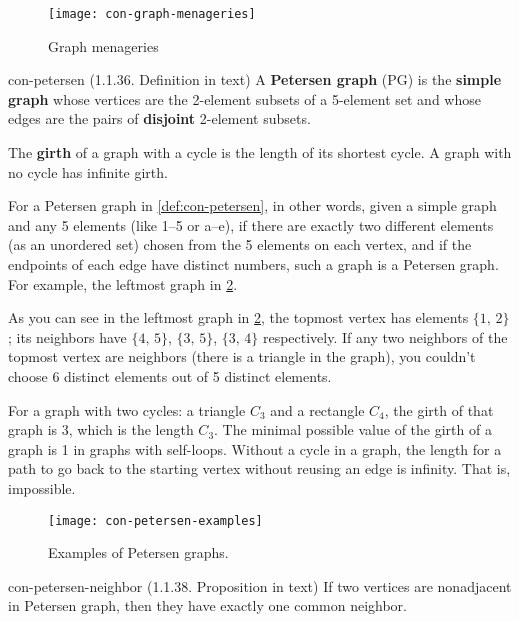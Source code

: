 \documentclass[../src/handouts/main.tex]{subfiles}
\begin{document}
\begin{figure}[htbp]
  \centering
  \texttt{[image: con-graph-menageries]}
  \caption{Graph menageries}
  \label{fig:con-graph-menageries}
\end{figure}

\begin{definition}{}{con-petersen}
  (1.1.36. Definition in text)
  A \textbf{Petersen graph} (PG) is the \textbf{simple graph} whose vertices are the 2-element subsets of a 5-element set and whose edges are the pairs of \textbf{disjoint} 2-element subsets.

  The \textbf{girth} of a graph with a cycle is the length of its shortest cycle. A graph with no cycle has infinite girth.
\end{definition}

For a Petersen graph in \cref{def:con-petersen}, in other words, given a simple graph and any 5 elements (like 1--5 or a--e), if there are exactly two different elements (as an unordered set) chosen from the 5 elements on each vertex, and if the endpoints of each edge have distinct numbers, such a graph is a Petersen graph. For example, the leftmost graph in \cref{fig:con-petersen-examples}.

As you can see in the leftmost graph in \cref{fig:con-petersen-examples}, the topmost vertex has elements $\{ 1,\, 2 \}$; its neighbors have $\{ 4,\, 5 \}$, $\{ 3,\, 5 \}$, $\{ 3,\, 4 \}$ respectively. If any two neighbors of the topmost vertex are neighbors (there is a triangle in the graph), you couldn't choose 6 distinct elements out of 5 distinct elements.

For a graph with two cycles: a triangle $C_3$ and a rectangle $C_4$, the girth of that graph is 3, which is the length $C_3$. The minimal possible value of the girth of a graph is 1 in graphs with self-loops. Without a cycle in a graph, the length for a path to go back to the starting vertex without reusing an edge is infinity. That is, impossible.

\begin{figure}[htbp]
  \centering
  \texttt{[image: con-petersen-examples]}
  \caption{Examples of Petersen graphs.}
  \label{fig:con-petersen-examples}
\end{figure}

\begin{proposition}{}{con-petersen-neighbor}
  (1.1.38. Proposition in text)
  If two vertices are nonadjacent in Petersen graph, then they have exactly one common neighbor.
\end{proposition}
\end{document}

